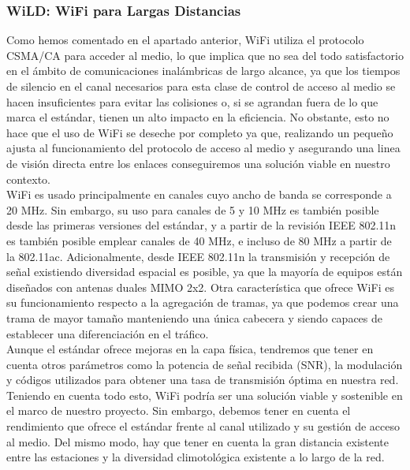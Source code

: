 \subsubsection{WiLD: WiFi para Largas Distancias}
Como hemos comentado en el apartado anterior, WiFi utiliza el protocolo CSMA/CA para acceder al medio, lo que implica que no sea del todo satisfactorio en el ámbito de comunicaciones inalámbricas de largo alcance, ya que los tiempos de silencio en el canal necesarios para esta clase de control de acceso al medio se hacen insuficientes para evitar las colisiones o, si se agrandan fuera de lo que marca el estándar, tienen un alto impacto en la eficiencia. No obstante, esto no hace que el uso de WiFi se deseche por completo ya que, realizando un pequeño ajusta al funcionamiento del protocolo de acceso al medio y asegurando una linea de visión directa entre los enlaces conseguiremos una solución viable en nuestro contexto.\\
		
WiFi es usado principalmente en canales cuyo ancho de banda se corresponde a 20 MHz. Sin embargo, su uso para canales de 5 y 10 MHz es también posible desde las primeras versiones del estándar, y a partir de la revisión IEEE 802.11n es también posible emplear canales de 40 MHz, e incluso de 80 MHz a partir de la 802.11ac. Adicionalmente, desde IEEE 802.11n la transmisión y recepción de señal existiendo diversidad espacial es posible, ya que la mayoría de equipos están diseñados con antenas duales MIMO 2x2. Otra característica que ofrece WiFi es su funcionamiento respecto a la agregación de tramas, ya que podemos crear una trama de mayor tamaño manteniendo una única cabecera y siendo capaces de establecer una diferenciación en el tráfico. \\
		
Aunque el estándar ofrece mejoras en la capa física, tendremos que tener en cuenta otros parámetros como la potencia de señal recibida (SNR), la modulación y códigos utilizados para obtener una tasa de transmisión óptima en nuestra red. Teniendo en cuenta todo esto, WiFi podría ser una solución viable y sostenible en el marco de nuestro proyecto. Sin embargo, debemos tener en cuenta el rendimiento que ofrece el estándar frente al canal utilizado y su gestión de acceso al medio. Del mismo modo, hay que tener en cuenta la gran distancia existente entre las estaciones y la diversidad climotológica existente a lo largo de la red.\\

